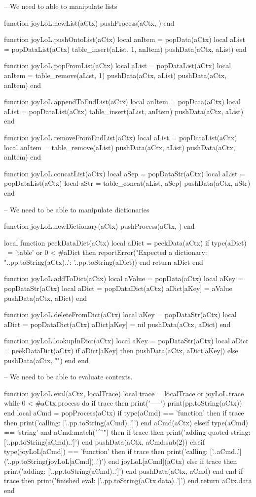 {{{{-- We need to able to manipulate lists

function joyLoL.newList(aCtx)
  pushProcess(aCtx, {})
end

function joyLoL.pushOntoList(aCtx)
  local anItem = popData(aCtx)
  local aList  = popDataList(aCtx)
  table_insert(aList, 1, anItem)
  pushData(aCtx, aList)
end

function joyLoL.popFromList(aCtx)
  local aList = popDataList(aCtx)
  local anItem = table_remove(aList, 1)
  pushData(aCtx, aList)
  pushData(aCtx, anItem)
end

function joyLoL.appendToEndList(aCtx)
  local anItem = popData(aCtx)
  local aList  = popDataList(aCtx)
  table_insert(aList, anItem)
  pushData(aCtx, aList)
end

function joyLoL.removeFromEndList(aCtx)
  local aList = popDataList(aCtx)
  local anItem = table_remove(aList)
  pushData(aCtx, aList)
  pushData(aCtx, anItem)
end

function joyLoL.concatList(aCtx)
  local aSep  = popDataStr(aCtx)
  local aList = popDataList(aCtx)
  local aStr = table_concat(aList, aSep)
  pushData(aCtx, aStr)
end

-- We need to be able to manipulate dictionaries

function joyLoL.newDictionary(aCtx)
  pushProcess(aCtx, {})
end

local function peekDataDict(aCtx)
  local aDict = peekData(aCtx)
  if type(aDict) ~= 'table' or 0 < #aDict then
    reportError("Expected a dictionary\naCtx: "..pp.toString(aCtx)..'\naDict: '..pp.toString(aDict))
  end
  return aDict
end

function joyLoL.addToDict(aCtx)
  local aValue = popData(aCtx)
  local aKey   = popDataStr(aCtx)
  local aDict  = popDataDict(aCtx)
  aDict[aKey] = aValue
  pushData(aCtx, aDict)
end

function joyLoL.deleteFromDict(aCtx)
  local aKey  = popDataStr(aCtx)
  local aDict = popDataDict(aCtx)
  aDict[aKey] = nil
  pushData(aCtx, aDict)
end

function joyLoL.lookupInDict(aCtx)
  local aKey  = popDataStr(aCtx)
  local aDict = peekDataDict(aCtx)
  if aDict[aKey] then
    pushData(aCtx, aDict[aKey])
  else
    pushData(aCtx, "")
  end
end

-- We need to be able to evaluate contexts.

function joyLoL.eval(aCtx, localTrace)
  local trace = localTrace or joyLoL.trace
  while 0 < #aCtx.process do
    if trace then
      print('\n\n-----')
      print(pp.toString(aCtx))
    end
    local aCmd = popProcess(aCtx)
    if type(aCmd) == 'function' then
      if trace then print('calling: ['..pp.toString(aCmd)..']') end
      aCmd(aCtx)
    elseif type(aCmd) == 'string' and aCmd:match("^'") then
      if trace then print('adding quoted string: ['..pp.toString(aCmd)..']') end
      pushData(aCtx, aCmd:sub(2))
    elseif type(joyLoL[aCmd]) == 'function' then
      if trace then print('calling: ['..aCmd..']('..pp.toString(joyLoL[aCmd])..')') end
      joyLoL[aCmd](aCtx)
    else
      if trace then print('adding: ['..pp.toString(aCmd)..']') end
      pushData(aCtx, aCmd)
    end
  end
  if trace then print('finished eval: ['..pp.toString(aCtx.data)..']') end
  return aCtx.data
end

}}}}
